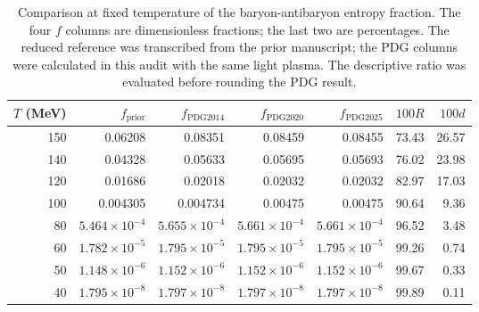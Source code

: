 \begin{table}[t]\centering\footnotesize
\caption{Comparison at fixed temperature of the baryon-antibaryon entropy fraction. The four $f$ columns are dimensionless fractions; the last two are percentages. The reduced reference was transcribed from the prior manuscript; the PDG columns were calculated in this audit with the same light plasma. The descriptive ratio was evaluated before rounding the PDG result.}\label{tab:comparison}
\setlength{\tabcolsep}{9pt}\renewcommand{\arraystretch}{1.14}
\begin{tabular}{rrrrrrr}\toprule
$T$ (MeV) & $f_{\mathrm{prior}}$ & $f_{\mathrm{PDG2014}}$ & $f_{\mathrm{PDG2020}}$ & $f_{\mathrm{PDG2025}}$ & $100R$ & $100d$ \\ \midrule
150 & 0.06208 & 0.08351 & 0.08459 & 0.08455 & 73.43 & 26.57 \\
140 & 0.04328 & 0.05633 & 0.05695 & 0.05693 & 76.02 & 23.98 \\
120 & 0.01686 & 0.02018 & 0.02032 & 0.02032 & 82.97 & 17.03 \\
100 & 0.004305 & 0.004734 & 0.00475 & 0.00475 & 90.64 & 9.36 \\
80 & $5.464\times10^{-4}$ & $5.655\times10^{-4}$ & $5.661\times10^{-4}$ & $5.661\times10^{-4}$ & 96.52 & 3.48 \\
60 & $1.782\times10^{-5}$ & $1.795\times10^{-5}$ & $1.795\times10^{-5}$ & $1.795\times10^{-5}$ & 99.26 & 0.74 \\
50 & $1.148\times10^{-6}$ & $1.152\times10^{-6}$ & $1.152\times10^{-6}$ & $1.152\times10^{-6}$ & 99.67 & 0.33 \\
40 & $1.795\times10^{-8}$ & $1.797\times10^{-8}$ & $1.797\times10^{-8}$ & $1.797\times10^{-8}$ & 99.89 & 0.11 \\
\bottomrule\end{tabular}\end{table}
